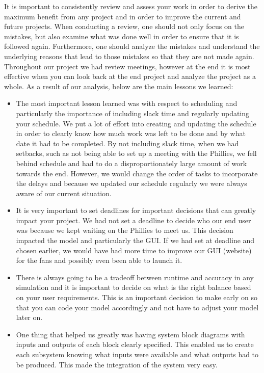 It is important to consistently review and assess your work in order
to derive the maximum benefit from any project and in order to improve
the current and future projects. When conducting a review, one should
not only focus on the mistakes, but also examine what was done well in
order to ensure that it is followed again. Furthermore, one should
analyze the mistakes and understand the underlying reasons that lead
to those mistakes so that they are not made again. Throughout our
project we had review meetings, however at the end it is most
effective when you can look back at the end project and analyze the
project as a whole. As a result of our analysis, below are the main
lessons we learned:

\begin{itemize}
    \item The most important lesson learned was with respect to
  scheduling and particularly the importance of including slack time
  and regularly updating your schedule. We put a lot of effort into
  creating and updating the schedule in order to clearly know how much
  work was left to be done and by what date it had to be completed. By
  not including slack time, when we had setbacks, such as not being
  able to set up a meeting with the Phillies, we fell behind schedule
  and had to do a disproportionately large amount of work towards the
  end. However, we would change the order of tasks to incorporate the
  delays and because we updated our schedule regularly we were always
  aware of our current situation.

    \item It is very important to set deadlines for important
  decisions that can greatly impact your project. We had not set a
  deadline to decide who our end user was because we kept waiting on
  the Phillies to meet us. This decision impacted the model and
  particularly the GUI. If we had set at deadline and chosen earlier,
  we would have had more time to improve our GUI (website) for the
  fans and possibly even been able to launch it.

    \item There is always going to be a tradeoff between runtime and
  accuracy in any simulation and it is important to decide on what is
  the right balance based on your user requirements. This is an
  important decision to make early on so that you can code your model
  accordingly and not have to adjust your model later on.

    \item One thing that helped us greatly was having system block
  diagrams with inputs and outputs of each block clearly
  specified. This enabled us to create each subsystem knowing what
  inputs were available and what outputs had to be produced. This made
  the integration of the system very easy.


\end{itemize}
